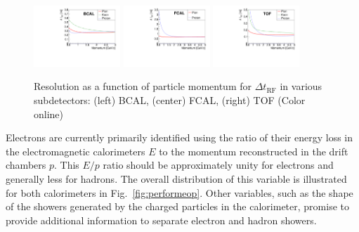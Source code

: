 \begin{figure}[tbp]
\begin{center}          
\includegraphics[width=0.29\textwidth]{figures/bcal_deltat_resol.pdf}
\includegraphics[width=0.29\textwidth]{figures/fcal_deltat_resol.pdf}
\includegraphics[width=0.29\textwidth]{figures/tof_deltat_resol.pdf}

\caption{\label{fig:timingresol}
Resolution as a function of particle momentum for  $\Delta t_\mathrm{RF}$ in various subdetectors: (left) BCAL, (center) FCAL, (right) TOF
 (Color online)}
\end{center}
\end{figure}


Electrons are currently primarily identified using the ratio of their energy loss in the electromagnetic calorimeters $E$ to the momentum reconstructed in the drift chambers $p$.  This $E/p$ ratio should be approximately unity for electrons and generally less for hadrons.  The overall distribution of this variable is illustrated for both calorimeters in  Fig.~\ref{fig:performeop}.  Other variables, such as the shape of the showers generated by the charged particles in the calorimeter, promise to provide additional information to separate electron and hadron showers.

